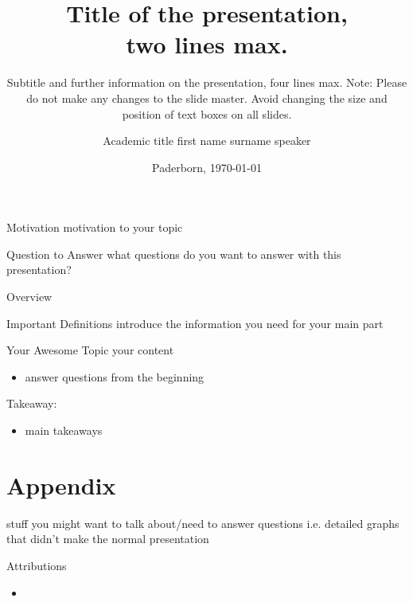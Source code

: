 \documentclass[
]{upbbeamer2023}
\title{Title of the presentation,\\two lines max.}
\subtitle{Subtitle and further information on the presentation, four lines max. Note: Please do not make any changes to the slide master. Avoid changing the size and position of text boxes on all slides.}
\institute{Research Group XYZ}
\author{Academic title first name surname speaker}
\date{Paderborn, \today}
\begin{document}
\begin{frame}[preface]{Motivation}
    motivation to your topic
\end{frame}

\begin{frame}[preface]{Question to Answer}
    what questions do you want to answer with this presentation?
\end{frame}

\begin{frame}[preface]{Overview}
    \tableofcontents
\end{frame}


\begin{frame}{Important Definitions}
    introduce the information you need for your main part
\end{frame}


\begin{frame}{Your Awesome Topic}
    your content
\end{frame}

\begin{frame}{\phantom{X}}

\end{frame}


\begin{frame}{\secname}
    \begin{itemize}
        \item answer questions from the beginning
    \end{itemize}
    \vspace*{1em}
    Takeaway:
    \begin{itemize}
        \item main takeaways
    \end{itemize}
\end{frame}

\section*{Appendix}\sectionframe

\begin{frame}{\secname}
    stuff you might want to talk about/need to answer questions
    i.e. detailed graphs that didn't make the normal presentation
\end{frame}

\begin{frame}{Attributions}
\begin{itemize}
    \item 
\end{itemize}
\end{frame}
\end{document}

